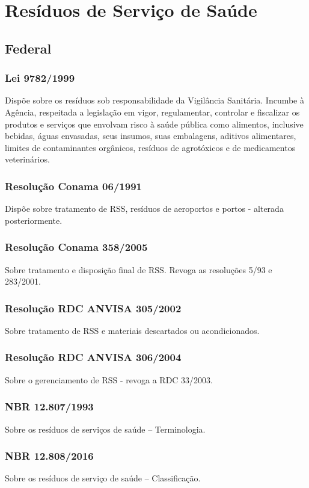 \section{Resíduos de Serviço de Saúde}
\begin{subapend}
\subsection{Federal}	
	\begin{subsubapend}
		
		\item \subsubsection{Lei 9782/1999}
		Dispõe sobre os resíduos sob responsabilidade da Vigilância Sanitária. Incumbe à Agência, respeitada a legislação em vigor, regulamentar, controlar e fiscalizar os produtos e serviços que envolvam risco à saúde pública como alimentos, inclusive bebidas, águas envasadas, seus insumos, suas embalagens, aditivos alimentares, limites de contaminantes orgânicos, resíduos de agrotóxicos e de medicamentos veterinários.
		\subsubsection{Resolução Conama 06/1991}
		Dispõe sobre tratamento de RSS, resíduos de aeroportos e portos - alterada posteriormente.
		\subsubsection{Resolução Conama 358/2005}
		Sobre tratamento e disposição final de RSS. Revoga as resoluções 5/93 e 283/2001.
		\subsubsection{Resolução RDC ANVISA 305/2002}
		Sobre tratamento de RSS e materiais descartados ou acondicionados.
		\subsubsection{Resolução RDC ANVISA 306/2004}
		Sobre o gerenciamento de RSS - revoga a RDC 33/2003.
		\subsubsection{NBR 12.807/1993}
		Sobre os resíduos de serviços de saúde – Terminologia.
		\subsubsection{NBR 12.808/2016}
		Sobre os resíduos de serviço de saúde – Classificação.

\end{subsubapend}
\end{subapend}
